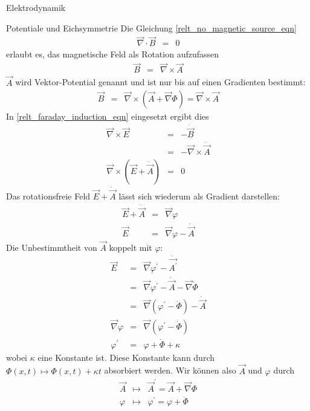 \begin{chapter}{\titlestr}
\begin{section}{Elektrodynamik}
\begin{subsection}{Potentiale und Eichsymmetrie}
Die Gleichung \ref{relt_no_magnetic_source_eqn}
\begin{eqnarray*}
\vec{\nabla}\cdot\vec{B} &=& 0
\end{eqnarray*}
erlaubt es, das magnetische Feld als Rotation aufzufassen
\begin{eqnarray*}
\vec{B} &=& \vec{\nabla}\times \vec{A}
\end{eqnarray*}
$\vec{A}$ wird Vektor-Potential genannt und ist nur bis auf einen Gradienten bestimmt:
\begin{eqnarray*}
\vec{B} &=& \vec{\nabla}\times \left(\vec{A}+\vec{\nabla}\Phi\right)=\vec{\nabla}\times\vec{A}
\end{eqnarray*}
In \ref{relt_faraday_induction_eqn} eingesetzt ergibt dies
\begin{eqnarray*}
\vec{\nabla}\times\vec{E} &=&-\dot{\vec{B}}\\
&=& -\vec{\nabla}\times\dot{\vec{A}}\\
\vec{\nabla}\times\left(\vec{E}+\dot{\vec{A}}\right) &=& 0
\end{eqnarray*}
Das rotationsfreie Feld $\vec{E}+\dot{\vec{A}}$ lässt sich wiederum als Gradient darstellen:
\begin{eqnarray*}
\vec{E}+\dot{\vec{A}} &=& \vec{\nabla}\varphi\\
\vec{E} &=& \vec{\nabla}\varphi-\dot{\vec{A}}
\end{eqnarray*}
Die Unbestimmtheit von $\vec{A}$ koppelt mit $\varphi$:
\begin{eqnarray*}
\vec{E} &=& \vec{\nabla}\varphi^\prime-\dot{\vec{A^\prime}}\\
&=& \vec{\nabla}\varphi^\prime-\dot{\vec{A}}-\vec{\nabla}\dot{\Phi}\\
&=& \vec{\nabla}\left(\varphi^\prime-\dot{\Phi}\right)-\dot{\vec{A}}\\
\vec{\nabla}\varphi &=& \vec{\nabla}\left(\varphi^\prime-\dot{\Phi}\right)\\
\varphi^\prime &=& \varphi+\dot{\Phi}+\kappa
\end{eqnarray*}
wobei $\kappa$ eine Konstante ist. Diese Konstante kann durch $\Phi(x,t)\mapsto \Phi(x,t)+\kappa t$ absorbiert werden. Wir können also $\vec{A}$ und $\varphi$ durch
\begin{eqnarray*}
\vec{A} &\mapsto& \vec{A}^\prime=\vec{A}+\vec{\nabla}\Phi\\
\varphi &\mapsto& \varphi^\prime= \varphi+\dot{\Phi}
\end{eqnarray*}

\end{subsection}
\end{section}
\end{chapter}

